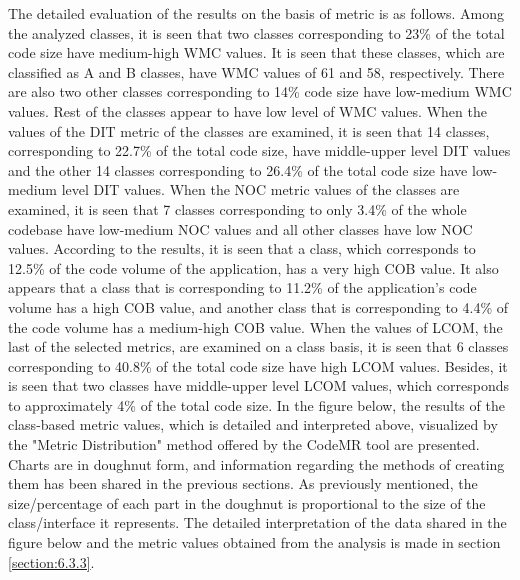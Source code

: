 The detailed evaluation of the results on the basis of metric is as follows. Among the analyzed classes, it is seen that two classes corresponding to 23\% of the total code size have medium-high WMC values. It is seen that these classes, which are classified as A and B classes, have WMC values of 61 and 58, respectively. There are also two other classes corresponding to 14\% code size have low-medium WMC values. Rest of the classes appear to have low level of WMC values.  When the values of the DIT metric of the classes are examined, it is seen that 14 classes, corresponding to 22.7\% of the total code size, have middle-upper level DIT values and the other 14 classes corresponding to 26.4\% of the total code size have low-medium level DIT values. When the NOC metric values of the classes are examined, it is seen that 7 classes corresponding to only 3.4\% of the whole codebase have low-medium NOC values and all other classes have low NOC values. According to the results, it is seen that a class, which corresponds to 12.5\% of the code volume of the application, has a very high COB value. It also appears that a class that is corresponding to 11.2\% of the application's code volume has a high COB value, and another class that is corresponding to 4.4\% of the code volume has a medium-high COB value. When the values of LCOM, the last of the selected metrics, are examined on a class basis, it is seen that 6 classes corresponding to 40.8\% of the total code size have high LCOM values. Besides, it is seen that two classes have middle-upper level LCOM values, which corresponds to approximately 4\% of the total code size. In the figure below, the results of the class-based metric values, which is detailed and interpreted above, visualized by the "Metric Distribution" method offered by the CodeMR tool are presented. Charts are in doughnut form, and information regarding the methods of creating them has been shared in the previous sections. As previously mentioned,  the size/percentage of each part in the doughnut is proportional to the size of the class/interface it represents. The detailed interpretation of the data shared in the figure below and the metric values obtained from the analysis is made in section \ref{section:6.3.3}.

